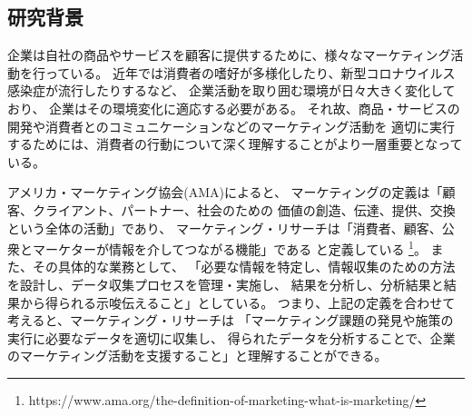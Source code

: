 
\subsection{研究背景}

企業は自社の商品やサービスを顧客に提供するために、様々なマーケティング活動を行っている。
近年では消費者の嗜好が多様化したり、新型コロナウイルス感染症が流行したりするなど、
企業活動を取り囲む環境が日々大きく変化しており、
企業はその環境変化に適応する必要がある。
それ故、商品・サービスの開発や消費者とのコミュニケーションなどのマーケティング活動を
適切に実行するためには、消費者の行動について深く理解することがより一層重要となっている。

アメリカ・マーケティング協会(AMA)によると、
マーケティングの定義は「顧客、クライアント、パートナー、社会のための
価値の創造、伝達、提供、交換という全体の活動」であり、
マーケティング・リサーチは「消費者、顧客、公衆とマーケターが情報を介してつながる機能」である
と定義している
\footnote{https://www.ama.org/the-definition-of-marketing-what-is-marketing/}。
また、その具体的な業務として、
「必要な情報を特定し、情報収集のための方法を設計し、データ収集プロセスを管理・実施し、
結果を分析し、分析結果と結果から得られる示唆伝えること」としている。
つまり、上記の定義を合わせて考えると、マーケティング・リサーチは
「マーケティング課題の発見や施策の実行に必要なデータを適切に収集し、
得られたデータを分析することで、企業のマーケティング活動を支援すること」と理解することができる。


